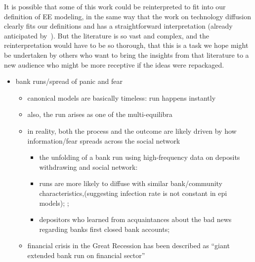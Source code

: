 It is possible that some of this work could be reinterpreted to fit into our definition of EE modeling, in the same way that the work on technology diffusion
clearly fits our definitions and has a straightforward interpretation (already anticipated by~\cite{arrow_classificatory_1969}).  But the literature is so vast and complex, and the reinterpretation would have to be so thorough, that this is a task we hope might be undertaken by others who want to bring the insights from that literature to a new audience who might be more receptive if the ideas were repackaged.

\begin{itemize}

	\item
	bank runs/spread of panic and fear

	\begin{itemize}
		\item
		canonical models are basically timeless: run happens instantly
		\href{https://www.jstor.org/stable/1837095}{\cite{diamond_bank_1983}}
		\item also,  the run arises as one of the multi-equilibra
		\item
		in reality, both the process and the outcome are likely driven by how information/fear spreads across the social network
		\begin{itemize}
			\item  the unfolding of a bank run using high-frequency data on deposits withdrawing and social network: \href{https://www.aeaweb.org/articles?id=10.1257/aer.102.4.1414}{\cite{iyer2012understanding}}
			\item runs are more likely to diffuse with similar bank/community characteristics,(suggesting infection rate is not constant in epi models);  \href{https://journals.sagepub.com/doi/abs/10.1177/0003122416629611}{\cite{greve2016ripples}};
			\item  depositors who learned from acquaintances about the bad news regarding banks first closed bank accounts; \href{https://www.aeaweb.org/articles?id=10.1257/aer.90.5.1110}{\cite{kelly2000market}}
		\end{itemize}
		\item
		financial crisis in the Great Recession has been described as
		``giant extended bank run on financial sector''
	\end{itemize}


\end{itemize}
